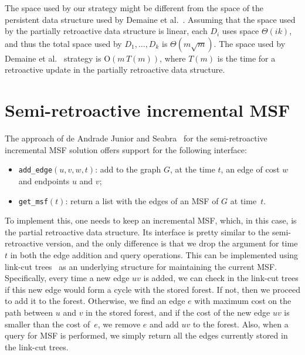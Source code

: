 \documentclass[reqno,11pt]{amsart}
\newcommand{\Oh}{\mathrm{O}}
\begin{document}


\medskip 

The space used by our strategy might be different from the space of 
the persistent data structure used by Demaine et al.~\cite{DemaineIL2007}. 
Assuming that the space used by the partially retroactive 
data structure is linear, each $D_i$ uses space $\Theta(ik)$, 
and thus the total space used by $D_1,\ldots,D_k$ is $\Theta(m\sqrt{m})$. 
The space used by Demaine et al.~\cite{DemaineIL2007} strategy is $\Oh(m\,T(m))$, 
where $T(m)$ is the time for a retroactive update in the partially retroactive data structure. 

\section{Semi-retroactive incremental MSF}\label{sec:incMSF}

The approach of de Andrade Junior and Seabra~\cite{deAndradeJrS2022} for the 
semi-retroactive incremental MSF solution offers support for the following interface:
\begin{itemize}
\item \texttt{add\_edge}$(u,v,w,t)$: add to the graph $G$, at the time $t$,
  an edge of cost $w$ and endpoints $u$ and $v$;
\item \texttt{get\_msf}$(t)$: return a list with the edges of an MSF of $G$ at
  time~$t$.
\end{itemize}

To implement this, one needs to keep an incremental MSF, which, in
this case, is the partial retroactive data structure. Its interface is
pretty similar to the semi-retroactive version, and the only difference
is that we drop the argument for time $t$ in both the edge addition and 
query operations. This can be implemented using link-cut trees~\cite{SleatorT1981} 
as an underlying structure for maintaining the current MSF. Specifically, 
every time a new edge $uv$ is added, we can check in the link-cut trees if 
this new edge would form a cycle with the stored forest. If not, then we 
proceed to add it to the forest.  
Otherwise, we find an edge $e$ with maximum cost on the path between $u$ 
and $v$ in the stored forest, and if the cost of the new edge $uv$ is smaller 
than the cost of~$e$, we remove $e$ and add $uv$ to the forest.
Also, when a query for MSF is performed, 
we simply return all the edges currently stored in the link-cut trees.
\end{document}
